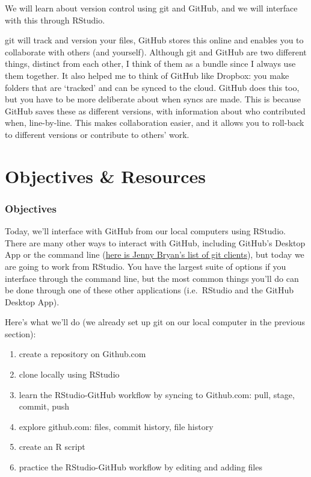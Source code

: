 \documentclass[]{book}
\providecommand{\tightlist}{%
  \setlength{\itemsep}{0pt}\setlength{\parskip}{0pt}}
\theoremstyle{definition}
\theoremstyle{definition}
\theoremstyle{definition}
\theoremstyle{remark}
\begin{document}
We will learn about version control using git and GitHub, and we will
interface with this through RStudio.

git will track and version your files, GitHub stores this online and
enables you to collaborate with others (and yourself). Although git and
GitHub are two different things, distinct from each other, I think of
them as a bundle since I always use them together. It also helped me to
think of GitHub like Dropbox: you make folders that are `tracked' and
can be synced to the cloud. GitHub does this too, but you have to be
more deliberate about when syncs are made. This is because GitHub saves
these as different versions, with information about who contributed
when, line-by-line. This makes collaboration easier, and it allows you
to roll-back to different versions or contribute to others' work.

\section{Objectives \& Resources}\label{objectives-resources-1}

\subsubsection{Objectives}\label{objectives}

Today, we'll interface with GitHub from our local computers using
RStudio. There are many other ways to interact with GitHub, including
GitHub's Desktop App or the command line
(\href{http://stat545.com/git02_git-clients.html}{here is Jenny Bryan's
list of git clients}), but today we are going to work from RStudio. You
have the largest suite of options if you interface through the command
line, but the most common things you'll do can be done through one of
these other applications (i.e.~RStudio and the GitHub Desktop App).

Here's what we'll do (we already set up git on our local computer in the
previous section):

\begin{enumerate}
\def\labelenumi{\arabic{enumi}.}
\tightlist
\item
  create a repository on Github.com
\item
  clone locally using RStudio
\item
  learn the RStudio-GitHub workflow by syncing to Github.com: pull,
  stage, commit, push
\item
  explore github.com: files, commit history, file history
\item
  create an R script
\item
  practice the RStudio-GitHub workflow by editing and adding files
\end{enumerate}
\end{document}
